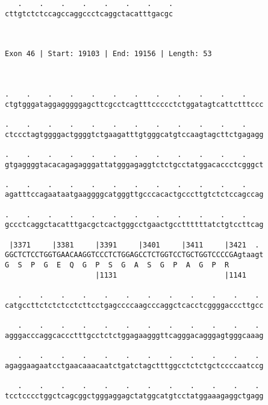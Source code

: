 \documentclass{article}
\begin{document}
\begin{Verbatim}
   .    .    .    .    .    .    .    .
cttgtctctccagccaggccctcaggctacatttgacgc
                                       
                                       
 
Exon 46 | Start: 19103 | End: 19156 | Length: 53



.    .    .    .    .    .    .    .    .    .    .    .    
ctgtgggataggagggggagcttcgcctcagtttccccctctggatagtcattctttccc
                                                            
.    .    .    .    .    .    .    .    .    .    .    .    
ctccctagtggggactggggtctgaagatttgtgggcatgtccaagtagcttctgagagg
                                                            
.    .    .    .    .    .    .    .    .    .    .    .    
gtgaggggtacacagagagggattatgggagaggtctctgcctatggacaccctcgggct
                                                            
.    .    .    .    .    .    .    .    .    .    .    .    
agatttccagaataatgaaggggcatgggttgcccacactgcccttgtctctccagccag
                                                            
.    .    .    .    .    .    .    .    .    .    .    .    
gccctcaggctacatttgacgctcactgggcctgaactgccttttttatctgtccttcag
                                                            
 |3371     |3381     |3391     |3401     |3411     |3421  . 
GGCTCTCCTGGTGAACAAGGTCCCTCTGGAGCCTCTGGTCCTGCTGGTCCCCGAgtaagt
G  S  P  G  E  Q  G  P  S  G  A  S  G  P  A  G  P  R        
                     |1131                         |1141    
  
   .    .    .    .    .    .    .    .    .    .    .    . 
catgccttctctctcctcttcctgagccccaagcccaggctcacctcggggacccttgcc
                                                            
   .    .    .    .    .    .    .    .    .    .    .    . 
agggacccaggcaccctttgcctctctggagaagggttcagggacagggagtgggcaaag
                                                            
   .    .    .    .    .    .    .    .    .    .    .    . 
agaggaagaatcctgaacaaacaatctgatctagctttggcctctctgctccccaatccg
                                                            
   .    .    .    .    .    .    .    .    .    .    .    . 
tcctcccctggctcagcggctgggaggagctatggcatgtcctatggaaagaggctgagg
                                                            

\end{Verbatim}
\end{document}
